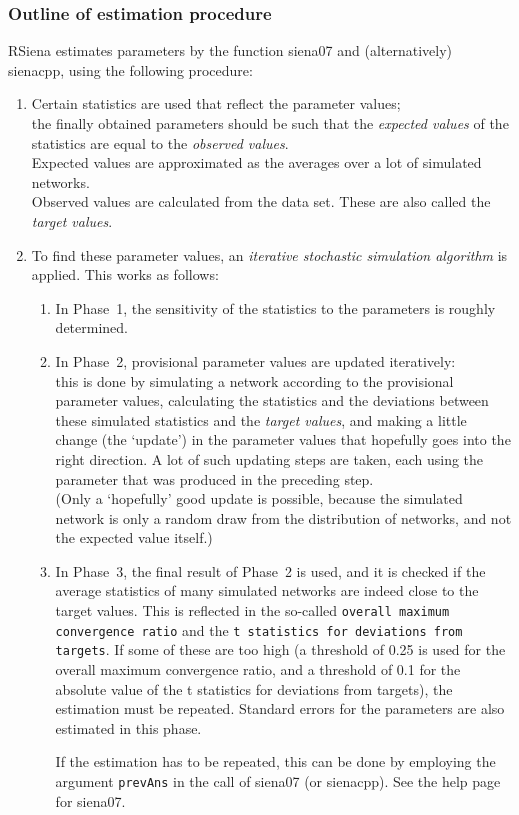\documentclass[a4paper,fleqn,11pt]{article}
\newcommand{\+}{\, + \,}
\newcommand{\sfn}[1]{\textsf{#1}}
\newcommand{\RS}{{\sf \textsf{RSiena} }}
\begin{document}
\subsubsection{Outline of estimation procedure}
\label{S_estim}
\noindent
\RS estimates parameters by the function \sfn{siena07}
and (alternatively) \sfn{sienacpp}, using the following procedure:
\begin{enumerate}
\item  Certain statistics are used that reflect the parameter values;\\
  the finally obtained parameters should be such that the \emph{expected
    values}
  of the statistics are equal to the \emph{observed values}.\\
  Expected values are approximated as the averages over a lot of simulated
  networks.\\
  Observed values are calculated from the data set. These are also called the
  \emph{target values}.
\item To find these parameter values, an \emph{iterative stochastic simulation
    algorithm}
  is applied.
  This works as follows:
\begin{enumerate}
\item In Phase~1, the sensitivity of the statistics to the parameters is roughly
  determined.
\item In Phase~2, provisional parameter values are updated iteratively:\\
  this is done by simulating a network according to the provisional parameter
  values, calculating the statistics and the deviations between these simulated
  statistics and the \emph{target values}, and making a little change (the
  `update') in the parameter values
  that hopefully goes into the right direction. A lot of such updating steps
  are taken, each using the parameter that was produced in the preceding step.\\
  (Only a `hopefully' good update is possible, because the simulated network is
  only a random draw from the distribution of networks, and not the expected
  value itself.)
\item In Phase~3, the final result of Phase~2 is used, and it is checked if the
  average statistics of many simulated networks are indeed close to the target
  values. This is reflected in the so-called
  \texttt{overall maximum convergence ratio} and the \texttt{t statistics for deviations
  from targets}. If some of these are too high (a threshold of 0.25 is used for the
  overall maximum convergence ratio, and a threshold of 0.1 for the absolute value
  of the t statistics for deviations from targets), the estimation must be repeated.
   Standard errors for the parameters are also estimated in this
  phase.

  If the estimation has to be repeated, this can be done by employing the
  argument \texttt{prevAns} in the call of \sfn{siena07}
  (or \sfn{sienacpp}).
  See the help page for  \sfn{siena07}.
\end{enumerate}
\end{enumerate}
\end{document}
